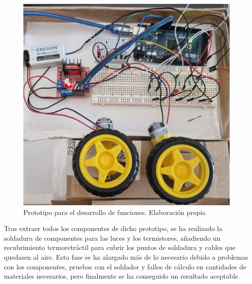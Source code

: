 \begin{figure}[H]
    \centering
    \includegraphics[width=1\textwidth]{imagenes/montaje/prototipo.jpg}
    \caption{Prototipo para el desarrollo de funciones. Elaboración propia}
\end{figure}

 Tras extraer todos los componentes de dicho prototipo, se ha realizado la soldadura de componentes para las luces y los termistores, añadiendo un recubrimiento termoretráctil para cubrir los puntos de soldadura y cables que quedasen al aire. Esta fase se ha alargado más de lo necesario debido a problemas con los componentes, pruebas con el soldador y fallos de cálculo en cantidades de materiales necesarios, pero finalmente se ha conseguido un resultado aceptable. 

